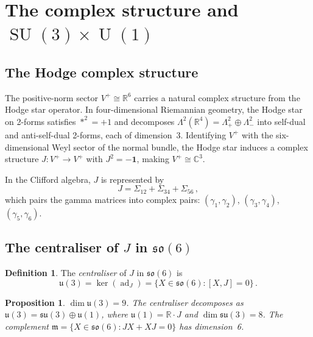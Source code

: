 \documentclass[12pt,a4paper]{article}
\newtheorem{proposition}[theorem]{Proposition}
\theoremstyle{definition}
\newtheorem{definition}[theorem]{Definition}
\newcommand{\SU}{\operatorname{SU}}
\newcommand{\U}{\operatorname{U}}
\newcommand{\ad}{\operatorname{ad}}
\newcommand{\R}{\mathbb{R}}
\newcommand{\C}{\mathbb{C}}
\begin{document}
\section{The complex structure and \texorpdfstring{$\SU(3) \times \U(1)$}{SU(3)xU(1)}}
\label{sec:su3}

\subsection{The Hodge complex structure}

The positive-norm sector $V^+ \cong \R^6$ carries a natural complex structure from the Hodge star operator.
In four-dimensional Riemannian geometry, the Hodge star on 2-forms satisfies $\ast^2 = +1$ and decomposes $\Lambda^2(\R^4) = \Lambda^2_+ \oplus \Lambda^2_-$ into self-dual and anti-self-dual 2-forms, each of dimension~3.
Identifying $V^+$ with the six-dimensional Weyl sector of the normal bundle, the Hodge star induces a complex structure $J\colon V^+ \to V^+$ with $J^2 = -\mathbf{1}$, making $V^+ \cong \C^3$.

In the Clifford algebra, $J$ is represented by
\begin{equation}
\label{eq:J_clifford}
J = \Sigma_{12} + \Sigma_{34} + \Sigma_{56}\,,
\end{equation}
which pairs the gamma matrices into complex pairs: $(\gamma_1, \gamma_2)$, $(\gamma_3, \gamma_4)$, $(\gamma_5, \gamma_6)$.

\subsection{The centraliser of \texorpdfstring{$J$}{J} in \texorpdfstring{$\mathfrak{so}(6)$}{so(6)}}

\begin{definition}
The \emph{centraliser} of $J$ in $\mathfrak{so}(6)$ is
\begin{equation}
\mathfrak{u}(3) = \ker(\ad_J) = \{X \in \mathfrak{so}(6) : [X, J] = 0\}\,.
\end{equation}
\end{definition}

\begin{proposition}
\label{prop:u3}
$\dim \mathfrak{u}(3) = 9$.
The centraliser decomposes as $\mathfrak{u}(3) = \mathfrak{su}(3) \oplus \mathfrak{u}(1)$, where $\mathfrak{u}(1) = \R \cdot J$ and $\dim \mathfrak{su}(3) = 8$.
The complement $\mathfrak{m} = \{X \in \mathfrak{so}(6) : JX + XJ = 0\}$ has dimension~6.
\end{proposition}
\end{document}
